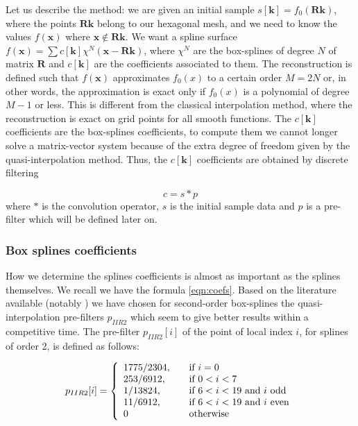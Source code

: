 \documentclass[proc]{edpsmath}
\begin{document}
Let us describe the method: we are given an initial sample $s[\mathbf{k}] = f_0(\mathbf{R} \mathbf{k})$, where the points $\mathbf{R} \mathbf{k}$ belong to our hexagonal mesh, and we need to know the values $f(\mathbf{x})$ where $\mathbf{x} \notin \mathbf{R} \mathbf{k}$. We want a spline surface $f(\mathbf{x}) = \sum c[\mathbf{k}] \chi^N(\mathbf{x} - \mathbf{R}\mathbf{k})$, where $\chi^N$ are the box-splines of degree $N$ of matrix $\mathbf{R}$ and $c[\mathbf{k}]$ are the coefficients associated to them. The reconstruction is defined such that $f(\mathbf{x})$ approximates $f_0(x)$ to a certain order $M=2N$ or, in other words, the approximation is exact only if $f_0(x)$ is a polynomial of degree $M-1$ or less. This is different from the classical interpolation method, where the reconstruction is exact on grid points for all smooth functions. The $c[\mathbf{k}]$ coefficients are the box-splines coefficients, to compute them we cannot longer solve a matrix-vector system because of the extra degree of freedom given by the quasi-interpolation method. Thus, the  $c[\mathbf{k}]$ coefficients are obtained by discrete filtering\cite{Condat2006a}

\begin{equation}
\label{eqn:coefs}
 c = s * p
\end{equation}
where $*$ is the convolution operator, $s$ is the initial sample data and $p$ is a pre-filter which will be defined later on.


\subsubsection{Box splines coefficients}

How we determine the splines coefficients is almost as important as the splines themselves. We recall we have the formula \eqref{eqn:coefs}. Based on the literature available (notably \cite{Condat2007}) we have chosen for second-order box-splines the quasi-interpolation pre-filters $p_{IIR2}$ which seem to give better results within a competitive time. The pre-filter $p_{IIR2}[i]$ of the point of local index $i$, for splines of order 2, is defined as follows: 


\begin{equation}
\label{eqn:filterIIR2}
p_{IIR2} [i] = \left\{
  \begin{array}{l l}
    1775/2304\text{,} & \quad \text{if } i = 0\\
    253/6912\text{,} & \quad \text{if } 0<i<7\\
    1/13824\text{,} & \quad \text{if } 6<i<19 \text{ and $i$ odd}\\
    11/6912\text{,} & \quad \text{if } 6<i<19 \text{ and $i$ even}\\
    0 & \quad \text{otherwise}
  \end{array} \right.
\end{equation}
\end{document}
